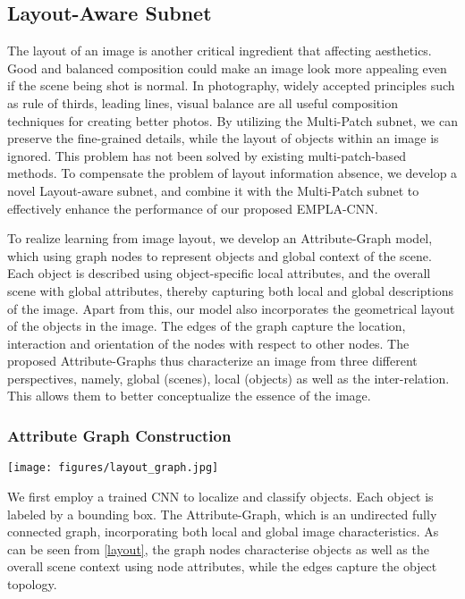 \documentclass[10pt,twocolumn,letterpaper]{article}
\begin{document}
\subsection{Layout-Aware Subnet}
The layout of an image is another critical ingredient that
affecting aesthetics. Good and balanced composition could make an 
image look more appealing even if the scene being shot is normal. 
In photography, widely accepted principles such as rule of thirds, 
leading lines, visual balance are all useful composition techniques 
for creating better photos. 
By utilizing the Multi-Patch subnet, we can preserve the fine-grained 
details, while the layout of objects within an image is ignored. 
This problem has not been solved by existing multi-patch-based methods. 
To compensate the problem of layout information absence, we develop
a novel Layout-aware subnet, and combine it with the Multi-Patch subnet 
to effectively enhance the performance of our proposed EMPLA-CNN.

To realize learning from image layout, we develop an Attribute-Graph model, which using graph nodes to represent objects and global context of the scene. Each object is described using object-specific local attributes, and the overall scene with global attributes, thereby capturing both local and global 
descriptions of the image. Apart from this, our model also incorporates 
the geometrical layout of the objects in the image. The edges of the 
graph capture the location, interaction and orientation of the nodes 
with respect to other nodes. The proposed Attribute-Graphs thus characterize
an image from three different perspectives, namely, global (scenes), local (objects) as well as the inter-relation. This allows them to better conceptualize the essence of the image.

\subsubsection{Attribute Graph Construction}

\begin{figure*}
	\centering
	\texttt{[image: figures/layout\_graph.jpg]}
	\label{layout}
\end{figure*}

We first employ a trained CNN to localize and classify objects. Each 
object is labeled by a bounding box. The Attribute-Graph, which is an 
undirected fully connected graph, incorporating both local and global 
image characteristics. As can be seen from \ref{layout},
the graph nodes characterise objects as well as the overall scene context using 
node attributes,  while the edges capture the object topology. 
\end{document}
